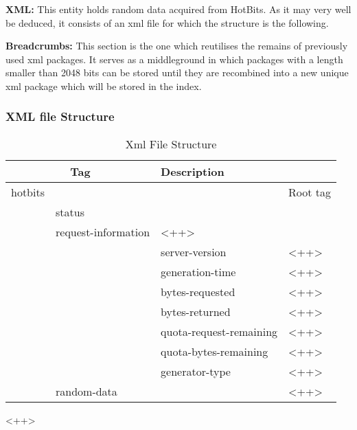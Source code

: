 \documentclass[11pt, A4]{article}
\begin{document}
\textbf{XML:} This entity holds random data acquired from HotBits.
As it may very well be deduced,  it consists of an xml file for which the
structure is the following.  %

\textbf{Breadcrumbs:} This section is the one which reutilises the remains of
previously used xml packages. It serves as a middleground in which packages
with a length smaller than 2048 bits can be stored until they are recombined
into a new unique xml package which will be stored in the index. \\

\subsubsection{XML file Structure}
\begin{table}
    \caption{Xml File Structure}
    \label{xml_file_structure}
    \begin{center}
        \begin{tabular}{l | l |l l}
            \toprule
            \multicolumn{2}{c}{Tag} & Description \\
            \toprule
            hotbits & & & Root tag \\
                    & status & & \\
                    & request-information & <++> \\
                    & & server-version & <++> \\
                    & & generation-time & <++> \\
                    & & bytes-requested & <++> \\
                    & & bytes-returned & <++> \\
                    & & quota-request-remaining & <++> \\
                    & & quota-bytes-remaining & <++> \\
                    & & generator-type & <++> \\
                    & random-data &  & <++> \\
            \bottomrule
        \end{tabular}
    \end{center}
\end{table}

<++>
\end{document}

